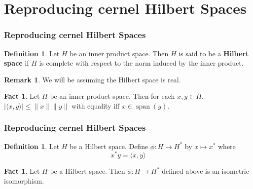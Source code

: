 \documentclass[notheorems]{beamer}
\theoremstyle{definition}
\newtheorem{defn}[definition]{Definition}
\newtheorem{fact}[definition]{Fact}
\newtheorem{rem}[definition]{Remark}
\renewcommand{\r}{\rangle}
\renewcommand{\l}{\langle}
\DeclareMathOperator{\spn}{span}
\begin{document}
\section{Reproducing cernel Hilbert Spaces}
\begin{frame}
\frametitle{Reproducing cernel Hilbert Spaces}



\begin{defn}
Let $H$ be an inner product space. Then $H$ is said to be a \textbf{Hilbert space} if $H$ is complete with respect to the norm induced by the inner product.
\end{defn}
\pause

\begin{rem}
We will be assuming the Hilbert space is real. 
\end{rem}
\pause

\begin{fact}
Let $H$ be an inner product space. Then for each $x,y \in H$, $|\l x, y\r| \leq \|x\| \|y\|$ with equality iff $x \in \spn(y)$.
\end{fact}
\end{frame}


















\begin{frame}
\frametitle{Reproducing cernel Hilbert Spaces}

\begin{defn}
Let $H$ be a Hilbert space. Define $\phi:H \rightarrow H^*$ by $x \mapsto x^*$ where $$x^*y = \l x ,y\r$$
\end{defn}
\pause

\begin{fact}
Let $H$ be a Hilbert space. Then $\phi: H \rightarrow H^*$ defined above is an isometric isomorphism.
\end{fact}

\end{frame}
\end{document}
